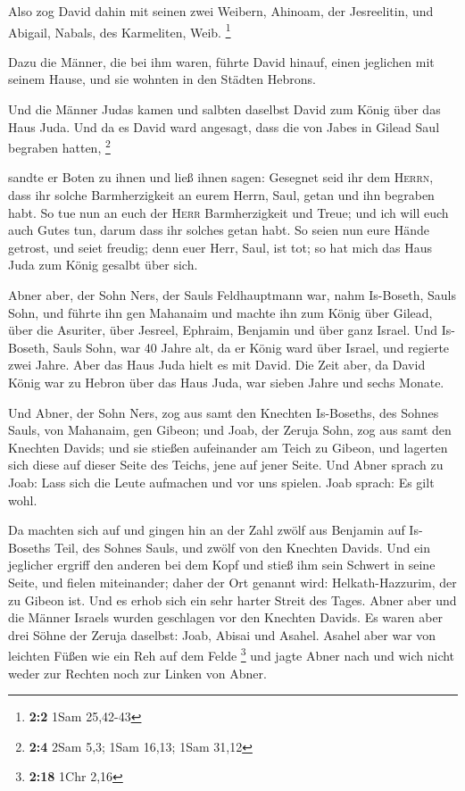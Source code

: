  Also zog David dahin mit seinen zwei Weibern, Ahinoam,
der Jesreelitin, und Abigail, Nabals, des Karmeliten, Weib. \footnote{\textbf{2:2}
  1Sam 25,42-43}

 Dazu die Männer, die bei ihm waren, führte David hinauf,
einen jeglichen mit seinem Hause, und sie wohnten in den Städten
Hebrons.

 Und die Männer Judas kamen und salbten daselbst David zum
König über das Haus Juda. Und da es David ward angesagt, dass die von
Jabes in Gilead Saul begraben hatten, \footnote{\textbf{2:4} 2Sam 5,3;
  1Sam 16,13; 1Sam 31,12}

 sandte er Boten zu ihnen und ließ ihnen sagen: Gesegnet
seid ihr dem \textsc{Herrn}, dass ihr solche Barmherzigkeit an eurem
Herrn, Saul, getan und ihn begraben habt.  So tue nun an
euch der \textsc{Herr} Barmherzigkeit und Treue; und ich will euch auch
Gutes tun, darum dass ihr solches getan habt.  So seien
nun eure Hände getrost, und seiet freudig; denn euer Herr, Saul, ist
tot; so hat mich das Haus Juda zum König gesalbt über sich.

 Abner aber, der Sohn Ners, der Sauls Feldhauptmann war,
nahm Is-Boseth, Sauls Sohn, und führte ihn gen Mahanaim 
und machte ihn zum König über Gilead, über die Asuriter, über Jesreel,
Ephraim, Benjamin und über ganz Israel.  Und Is-Boseth,
Sauls Sohn, war 40 Jahre alt, da er König ward über Israel, und regierte
zwei Jahre. Aber das Haus Juda hielt es mit David.  Die
Zeit aber, da David König war zu Hebron über das Haus Juda, war sieben
Jahre und sechs Monate.

 Und Abner, der Sohn Ners, zog aus samt den Knechten
Is-Boseths, des Sohnes Sauls, von Mahanaim, gen Gibeon; 
und Joab, der Zeruja Sohn, zog aus samt den Knechten Davids; und sie
stießen aufeinander am Teich zu Gibeon, und lagerten sich diese auf
dieser Seite des Teichs, jene auf jener Seite.  Und Abner
sprach zu Joab: Lass sich die Leute aufmachen und vor uns spielen. Joab
sprach: Es gilt wohl.

 Da machten sich auf und gingen hin an der Zahl zwölf aus
Benjamin auf Is-Boseths Teil, des Sohnes Sauls, und zwölf von den
Knechten Davids.  Und ein jeglicher ergriff den anderen
bei dem Kopf und stieß ihm sein Schwert in seine Seite, und fielen
miteinander; daher der Ort genannt wird: Helkath-Hazzurim, der zu Gibeon
ist.  Und es erhob sich ein sehr harter Streit des Tages.
Abner aber und die Männer Israels wurden geschlagen vor den Knechten
Davids.  Es waren aber drei Söhne der Zeruja daselbst:
Joab, Abisai und Asahel. Asahel aber war von leichten Füßen wie ein Reh
auf dem Felde \footnote{\textbf{2:18} 1Chr 2,16}  und
jagte Abner nach und wich nicht weder zur Rechten noch zur Linken von
Abner.


